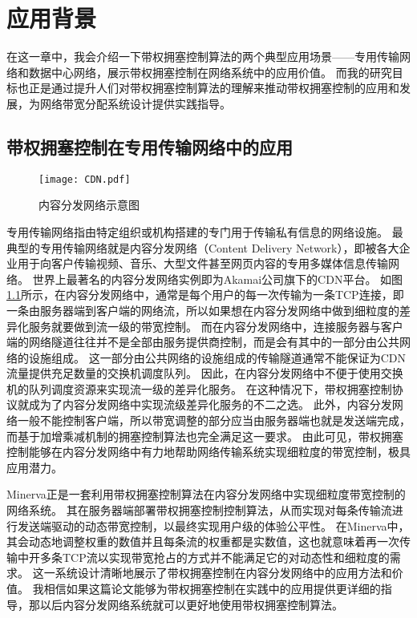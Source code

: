 \documentclass[winfonts]{njuthesis}
\begin{document}
\chapter{应用背景}\label{chapter:motivation}

在这一章中，我会介绍一下带权拥塞控制算法的两个典型应用场景——专用传输网络和数据中心网络，展示带权拥塞控制在网络系统中的应用价值。
而我的研究目标也正是通过提升人们对带权拥塞控制算法的理解来推动带权拥塞控制的应用和发展，为网络带宽分配系统设计提供实践指导。

\section{带权拥塞控制在专用传输网络中的应用}\label{sec:CDN}

\begin{figure}[ht]
  \centering
  \texttt{[image: CDN.pdf]}
  \caption{内容分发网络示意图}
  \label{fig:CDN}
\end{figure}

专用传输网络指由特定组织或机构搭建的专门用于传输私有信息的网络设施。
最典型的专用传输网络就是内容分发网络（Content Delivery Network），即被各大企业用于向客户传输视频、音乐、大型文件甚至网页内容的专用多媒体信息传输网络。
世界上最著名的内容分发网络实例即为Akamai公司旗下的CDN平台\cite{nygren2010the}。
如图\ref{fig:CDN}所示，在内容分发网络中，通常是每个用户的每一次传输为一条TCP连接，即一条由服务器端到客户端的网络流，所以如果想在内容分发网络中做到细粒度的差异化服务就要做到流一级的带宽控制。
而在内容分发网络中，连接服务器与客户端的网络隧道往往并不是全部由服务提供商控制，而是会有其中的一部分由公共网络的设施组成。
这一部分由公共网络的设施组成的传输隧道通常不能保证为CDN流量提供充足数量的交换机调度队列\cite{Nathan2019wcubic}。
因此，在内容分发网络中不便于使用交换机的队列调度资源来实现流一级的差异化服务。
在这种情况下，带权拥塞控制协议就成为了内容分发网络中实现流级差异化服务的不二之选。
此外，内容分发网络一般不能控制客户端，所以带宽调整的部分应当由服务器端也就是发送端完成，而基于加增乘减机制的拥塞控制算法也完全满足这一要求。
由此可见，带权拥塞控制能够在内容分发网络中有力地帮助网络传输系统实现细粒度的带宽控制，极具应用潜力。

Minerva\cite{Nathan2019wcubic}正是一套利用带权拥塞控制算法在内容分发网络中实现细粒度带宽控制的网络系统。
其在服务器端部署带权拥塞控制控制算法，从而实现对每条传输流进行发送端驱动的动态带宽控制，以最终实现用户级的体验公平性。
在Minerva中，其会动态地调整权重的数值并且每条流的权重都是实数值，这也就意味着再一次传输中开多条TCP流以实现带宽抢占的方式并不能满足它的对动态性和细粒度的需求。
这一系统设计清晰地展示了带权拥塞控制在内容分发网络中的应用方法和价值。
我相信如果这篇论文能够为带权拥塞控制在实践中的应用提供更详细的指导，那以后内容分发网络系统就可以更好地使用带权拥塞控制算法。
\end{document}
